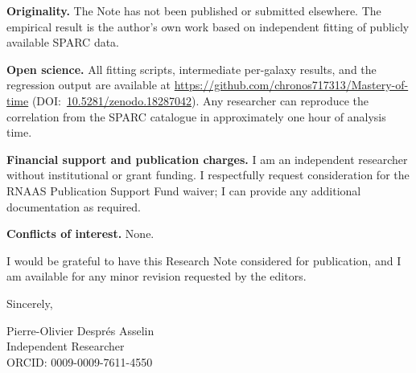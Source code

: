 \documentclass[12pt]{article}
\begin{document}
\bigskip

\textbf{Originality.}
The Note has not been published or submitted elsewhere. The empirical
result is the author's own work based on independent fitting of
publicly available SPARC data.

\bigskip

\textbf{Open science.}
All fitting scripts, intermediate per-galaxy results, and the
regression output are available at
\url{https://github.com/chronos717313/Mastery-of-time}
(DOI:~\href{https://doi.org/10.5281/zenodo.18287042}{10.5281/zenodo.18287042}).
Any researcher can reproduce the correlation from the SPARC catalogue
in approximately one hour of analysis time.

\bigskip

\textbf{Financial support and publication charges.}
I am an independent researcher without institutional or grant funding.
I respectfully request consideration for the RNAAS Publication Support
Fund waiver; I can provide any additional documentation as required.

\bigskip

\textbf{Conflicts of interest.}
None.

\bigskip

I would be grateful to have this Research Note considered for
publication, and I am available for any minor revision requested by
the editors.

\bigskip

Sincerely,

\bigskip

\noindent
Pierre-Olivier Despr\'{e}s Asselin \\
Independent Researcher \\
ORCID: 0009-0009-7611-4550
\end{document}
